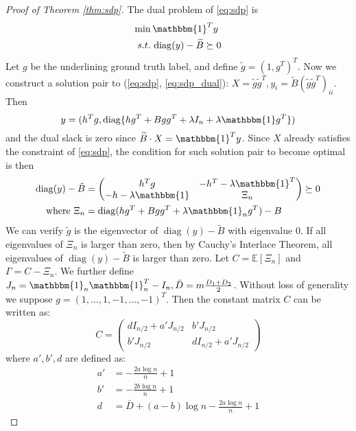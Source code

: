 \documentclass[conference]{IEEEtran}
\DeclareMathOperator{\diag}{diag}
\begin{document}
	\begin{proof}[Proof of Theorem \ref{thm:sdp}]
		The dual problem of \eqref{eq:sdp} is
		\begin{align}
		\min\, & \mathbbm{1}^T y \notag \\
		s.t.\,& \diag(y) - \widetilde{B} \succeq 0
		\label{eq:sdp_dual}
		\end{align}
		Let $g$ be the underlining ground truth label, and
		define $\tilde{g} = (1,g^T)^T$.
		Now we construct a solution pair to (\ref{eq:sdp}, \ref{eq:sdp_dual}): $X=\tilde{g}\tilde{g}^T, y_i = \tilde{B}(\tilde{g}\tilde{g}^T)_{ii}$.
		Then $$
		y = (h^T g, \diag\{hg^T+Bgg^T + \lambda I_n + \lambda \mathbbm{1}g^T\})
		$$
		and the dual slack is zero since $\widetilde{B} \cdot X = \mathbbm{1}^T y $.
		Since $X$ already satisfies the constraint of \eqref{eq:sdp}, the condition for such solution pair to become optimal is then
		\begin{align}
		\diag(y) - \tilde{B} & = \begin{pmatrix} h^T g & -h^T - \lambda \mathbbm{1}^T \\ -h- \lambda \mathbbm{1} & \Xi_n \end{pmatrix}
		\succeq 0 \notag \\
		\textrm{ where }\Xi_n & = \diag(hg^T + Bgg^T + \lambda \mathbbm{1}_ng^T) - B
		\end{align}
		We can verify $\tilde{g}$ is the eigenvector of $\diag(y) - \tilde{B}$ with eigenvalue $0$.
		If all eigenvalues of $\Xi_n$ is larger than zero, then by
		Cauchy’s Interlace Theorem, all eigenvalues of $\diag(y) - \tilde{B}$ is larger than zero.
		Let $C=\mathbb{E}[\Xi_n]$ and $\Gamma = C-\Xi_n$.
		We further define $J_n = \mathbbm{1}_n \mathbbm{1}_n^T - I_n, \bar{D}=m\frac{D_1+D_2}{2}$.
		Without loss of generality we suppose $g=(1, \dots, 1, -1, \dots, -1)^T$.
		Then the constant matrix $C$ can be written as:
		\begin{equation*}
		C=\begin{pmatrix}
		d I_{n/2} + a'J_{n/2}& b' J_{n/2} \\
		b' J_{n/2} & d I_{n/2} + a'J_{n/2}  
		\end{pmatrix}
		\end{equation*}
		where $a',b', d$ are defined as:
		\begin{align*}
		a' & = - \frac{2a \log n}{n} + 1 \\
		b' & = - \frac{2b \log n}{n} + 1 \\
		d & = \bar{D}+(a-b) \log n - \frac{2a \log n}{n} + 1
		\end{align*}
		

\end{proof}
\end{document}
